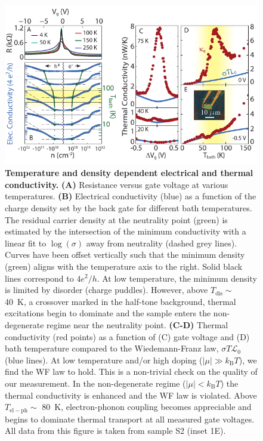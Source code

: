 \begin{figure}
\centering
\includegraphics[width=130mm]{figures/Dirac_fluid/Fig1.pdf}
\caption{\textbf{Temperature and density dependent electrical and thermal conductivity.} \textbf{(A)} Resistance versus gate voltage at various temperatures. \textbf{(B)} Electrical conductivity (blue) as a function of the charge density set by the back gate for different bath temperatures. The residual carrier density at the neutrality point (green) is estimated by the intersection of the minimum conductivity with a linear fit to $\log(\sigma)$ away from neutrality (dashed grey lines). Curves have been offset vertically such that the minimum density (green) aligns with the temperature axis to the right. Solid black lines correspond to $4e^2/h$. At low temperature, the minimum density is limited by disorder (charge puddles). However, above $T_{\mathrm{dis}}\sim$ 40~K, a crossover marked in the half-tone background, thermal excitations begin to dominate and the sample enters the non-degenerate regime near the neutrality point. \textbf{(C-D)} Thermal conductivity (red points) as a function of (C) gate voltage and (D) bath temperature compared to the Wiedemann-Franz law, $\sigma T\mathcal{L}_0$ (blue lines).  At low temperature and/or high doping ($|\mu| \gg k_{\mathrm{B}}T$), we find the WF law to hold.  This is a non-trivial check on the quality of our measurement. In the non-degenerate regime ($|\mu|<k_{\mathrm{B}}T$) the thermal conductivity is enhanced and the WF law is violated. Above $T_{\mathrm{el-ph}}\sim$ 80~K, electron-phonon coupling becomes appreciable and begins to dominate thermal transport at all measured gate voltages.   All data from this figure is taken from sample S2 (inset 1E).}
\label{fig:DF_Fig1}
\end{figure}

